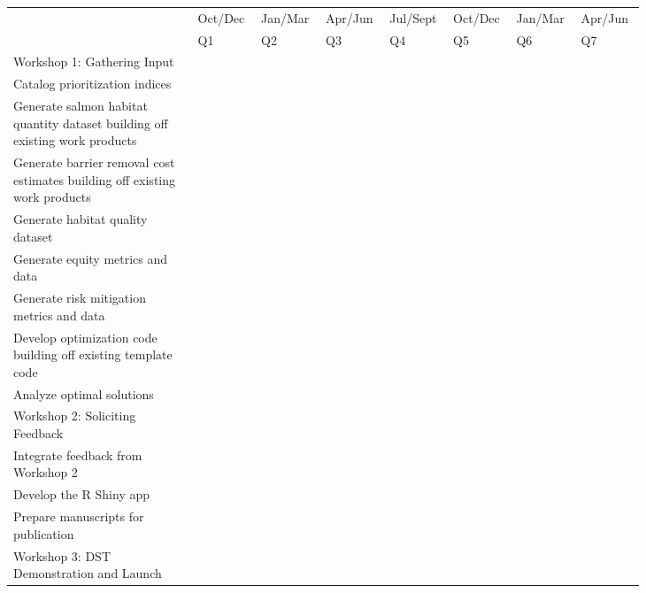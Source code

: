 \begin{table}[htb]
\small
\begin{tabular}{|p{0.275\linewidth} | p{0.08\linewidth} | p{0.08\linewidth} | p{0.08\linewidth} | p{0.08\linewidth} | p{0.08\linewidth} | p{0.08\linewidth} | p{0.08\linewidth} |}\hline
 &  Oct/Dec &  Jan/Mar  & Apr/Jun & Jul/Sept  & Oct/Dec & Jan/Mar & Apr/Jun \\
 &  Q1 &  Q2  & Q3 & Q4  & Q5 & Q6 & Q7\\\hline
Workshop 1: Gathering Input & \cellcolor{gray!50}  &   &  & &   &  & \\ \hline
Catalog prioritization indices &  \cellcolor{gray!50}  &  \cellcolor{gray!50}  &  & &   &  & \\\hline
Generate salmon habitat quantity dataset building off existing work products & \cellcolor{gray!50}  &  \cellcolor{gray!50}  & \cellcolor{gray!50}  & &   &  & \\\hline
Generate barrier removal cost estimates building off existing work products &  \cellcolor{gray!50} & \cellcolor{gray!50}   & \cellcolor{gray!50}  & \cellcolor{gray!50} &   &  & \\\hline
Generate habitat quality dataset &  \cellcolor{gray!50} &   \cellcolor{gray!50} &  \cellcolor{gray!50} & \cellcolor{gray!50} &   &  & \\\hline
Generate equity metrics and data & \cellcolor{gray!50}  &   \cellcolor{gray!50} & \cellcolor{gray!50}  & \cellcolor{gray!50} &   &  & \\\hline
Generate risk mitigation metrics and data & \cellcolor{gray!50}  &  \cellcolor{gray!50}  &\cellcolor{gray!50}   &\cellcolor{gray!50}  &   &  & \\\hline
Develop optimization code building off existing template code & \cellcolor{gray!50}  & \cellcolor{gray!50}   & \cellcolor{gray!50}  &\cellcolor{gray!50}  &  &   & \\\hline
Analyze optimal solutions &  &   & \cellcolor{gray!50}  & \cellcolor{gray!50} &  \cellcolor{gray!50}  & \cellcolor{gray!50}  & \\\hline
Workshop 2: Soliciting Feedback &  &   &  & \cellcolor{gray!50} &   &  & \\\hline
Integrate feedback from Workshop 2 &  &   &  & &  \cellcolor{gray!50}  &  \cellcolor{gray!50} & \cellcolor{gray!50} \\\hline
Develop the R Shiny app &  &   &  &  \cellcolor{gray!50} &  \cellcolor{gray!50}  &  \cellcolor{gray!50} & \cellcolor{gray!50} \\\hline
Prepare manuscripts for publication &  &   &  & &   &  \cellcolor{gray!50} & \cellcolor{gray!50} \\\hline
Workshop 3: DST Demonstration and Launch &  &   &  & &   &  & \cellcolor{gray!50} \\\hline

\end{tabular}
\end{table}
\FloatBarrier
 